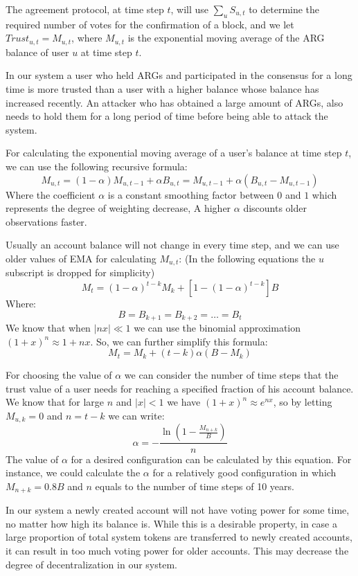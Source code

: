 \documentclass[11pt, a4paper]{report}
\begin{document}
    The agreement protocol, at time step \(t\), will use \(\sum_{u}S_{u,t}\) to determine the required
    number of votes for the confirmation of a block, and we let \(Trust_{u,t} = M_{u,t}\), where \(M_{u,t}\) is the
    exponential moving average of the ARG balance of user \(u\) at time step \(t\).

    In our system a user who held ARGs and participated in the consensus for a long time is more trusted
    than a user with a higher balance whose balance has increased recently. An attacker who has obtained a large
    amount of ARGs, also needs to hold them for a long period of time before being able to attack the system.

    For calculating the exponential moving average of a user's balance at time step \(t\), we can use the following
    recursive formula:
    \[
        M_{u,t} = (1 - \alpha) M_{u,t-1} + \alpha B_{u,t} = M_{u,t-1} + \alpha (B_{u,t} - M_{u,t-1})
    \]
    Where the coefficient \(\alpha\) is a constant smoothing factor between \(0\) and \(1\) which represents the
    degree of weighting decrease, A higher \(\alpha\) discounts older observations faster.

    Usually an account balance will not change in every time step, and we can use older values of EMA for calculating
    \(M_{u,t}\): (In the following equations the \(u\) subscript is dropped for simplicity)
    \[
        M_{t} = (1 - \alpha)^{t-k}M_{k} + [1 - (1 - \alpha)^{t - k}]B
    \]
    Where:
    \[
        B = B_{k+1} = B_{k+2} = \dots = B_{t}
    \]
    We know that when \(|nx| \ll 1\) we can use the binomial approximation \({(1 + x)^n \approx 1 + nx}\). So, we can
    further simplify this formula:
    \[
        M_{t} = M_{k} + (t - k) \alpha (B - M_{k})
    \]

    For choosing the value of \(\alpha\) we can consider the number of time steps that the trust value of a user needs
    for reaching a specified fraction of his account balance. We know that for large \(n\) and \(|x| < 1\) we have
    \((1 + x)^n \approx e^{nx}\), so by letting \(M_{u,k} = 0\) and \(n = t - k\) we can write:
    \[
        \alpha =- \frac{\ln\left(1 - \frac{M_{n+k}}{B}\right)}{n}
    \]
    The value of \(\alpha\) for a desired configuration can be calculated by this equation. For instance, we could
    calculate the \(\alpha\) for a relatively good configuration in which \(M_{n+k} = 0.8B\) and \(n\) equals to the
    number of time steps of 10 years.

    In our system a newly created account will not have voting power for some time, no matter how high its
    balance is. While this is a desirable property, in case a large proportion of total system tokens are
    transferred to newly created accounts, it can result in too much voting power for older accounts. This may decrease
    the degree of decentralization in our system.
\end{document}
